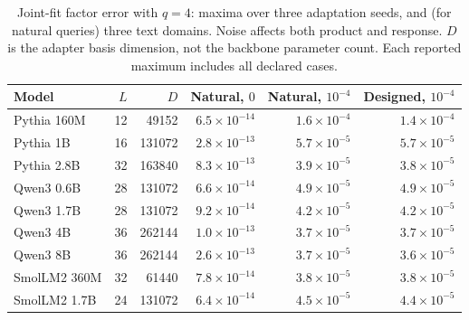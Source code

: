 \begin{table}[t]
\centering\small
\caption{Joint-fit factor error with $q=4$: maxima over three adaptation seeds, and (for natural queries) three text domains. Noise affects both product and response. $D$ is the adapter basis dimension, not the backbone parameter count. Each reported maximum includes all declared cases.}
\label{tab:llm-models}
\begin{tabular}{lrrrrr}
\toprule
Model & $L$ & $D$ & Natural, $0$ & Natural, $10^{-4}$ & Designed, $10^{-4}$\\
\midrule
Pythia 160M & 12 & 49152 & $6.5\!\times\!10^{-14}$ & $1.6\!\times\!10^{-4}$ & $1.4\!\times\!10^{-4}$\\
Pythia 1B & 16 & 131072 & $2.8\!\times\!10^{-13}$ & $5.7\!\times\!10^{-5}$ & $5.7\!\times\!10^{-5}$\\
Pythia 2.8B & 32 & 163840 & $8.3\!\times\!10^{-13}$ & $3.9\!\times\!10^{-5}$ & $3.8\!\times\!10^{-5}$\\
Qwen3 0.6B & 28 & 131072 & $6.6\!\times\!10^{-14}$ & $4.9\!\times\!10^{-5}$ & $4.9\!\times\!10^{-5}$\\
Qwen3 1.7B & 28 & 131072 & $9.2\!\times\!10^{-14}$ & $4.2\!\times\!10^{-5}$ & $4.2\!\times\!10^{-5}$\\
Qwen3 4B & 36 & 262144 & $1.0\!\times\!10^{-13}$ & $3.7\!\times\!10^{-5}$ & $3.7\!\times\!10^{-5}$\\
Qwen3 8B & 36 & 262144 & $2.6\!\times\!10^{-13}$ & $3.7\!\times\!10^{-5}$ & $3.6\!\times\!10^{-5}$\\
SmolLM2 360M & 32 & 61440 & $7.8\!\times\!10^{-14}$ & $3.8\!\times\!10^{-5}$ & $3.8\!\times\!10^{-5}$\\
SmolLM2 1.7B & 24 & 131072 & $6.4\!\times\!10^{-14}$ & $4.5\!\times\!10^{-5}$ & $4.4\!\times\!10^{-5}$\\
\bottomrule
\end{tabular}
\end{table}
